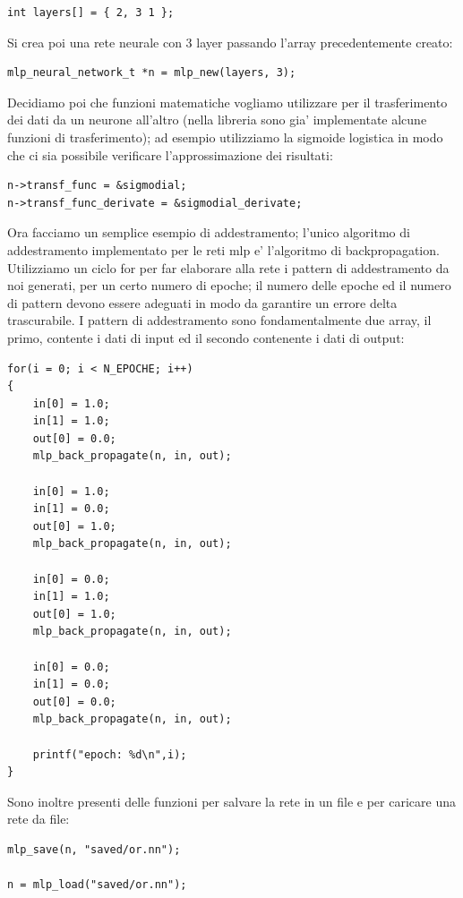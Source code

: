 \documentclass[a4paper,10pt]{report}
\begin{document}
\begin{verbatim}
int layers[] = { 2, 3 1 };
\end{verbatim}


Si crea poi una rete neurale con 3 layer passando l'array precedentemente creato:

\begin{verbatim}
mlp_neural_network_t *n = mlp_new(layers, 3);
\end{verbatim}


Decidiamo poi che funzioni matematiche vogliamo utilizzare per il trasferimento dei dati
da un neurone all'altro (nella libreria sono gia' implementate alcune funzioni di 
trasferimento);
ad esempio utilizziamo la sigmoide logistica in modo che ci sia possibile verificare 
l'approssimazione dei risultati:

\begin{verbatim}
n->transf_func = &sigmodial;
n->transf_func_derivate = &sigmodial_derivate;
\end{verbatim}


Ora facciamo un semplice esempio di addestramento; l'unico algoritmo di addestramento 
implementato
per le reti mlp e' l'algoritmo di backpropagation. Utilizziamo un ciclo for per far 
elaborare alla rete
i pattern di addestramento da noi generati, per un certo numero di epoche; il numero 
delle epoche ed il 
numero di pattern devono essere adeguati in modo da garantire un errore delta 
trascurabile.
I pattern di addestramento sono fondamentalmente due array, il primo, contente i dati 
di input
ed il secondo contenente i dati di output:
 
\begin{verbatim}
for(i = 0; i < N_EPOCHE; i++)
{
	in[0] = 1.0;
	in[1] = 1.0;
	out[0] = 0.0;	
	mlp_back_propagate(n, in, out);

	in[0] = 1.0;
	in[1] = 0.0;
	out[0] = 1.0;	
	mlp_back_propagate(n, in, out);

	in[0] = 0.0;
	in[1] = 1.0;
	out[0] = 1.0;	
	mlp_back_propagate(n, in, out);

	in[0] = 0.0;
	in[1] = 0.0;
	out[0] = 0.0;	
	mlp_back_propagate(n, in, out);

	printf("epoch: %d\n",i);
}
\end{verbatim}


Sono inoltre presenti delle funzioni per salvare la rete in un file e per
caricare una rete da file:

\begin{verbatim}
mlp_save(n, "saved/or.nn");

n = mlp_load("saved/or.nn");
\end{verbatim}
\end{document}
